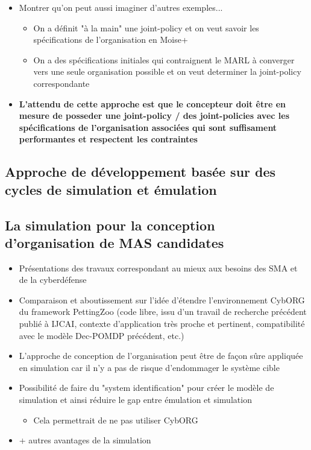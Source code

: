 \documentclass[runningheads]{llncs}
\begin{document}
\begin{itemize}
\begin{itemize}
\begin{itemize}
                    \end{itemize}
          \end{itemize}
    \item Montrer qu'on peut aussi imaginer d'autres exemples...
          \begin{itemize}
              \item On a définit "à la main" une joint-policy et on veut savoir les spécifications de l'organisation en Moise+
              \item On a des spécifications initiales qui contraignent le MARL à converger vers une seule organisation possible et on veut determiner la joint-policy correspondante
          \end{itemize}
    \item \textbf{L'attendu de cette approche est que le concepteur doit être en mesure de posseder une joint-policy / des joint-policies avec les spécifications de l'organisation associées qui sont suffisament performantes et respectent les contraintes}
\end{itemize}

\subsection{Approche de développement basée sur des cycles de simulation et émulation}

\subsection{La simulation pour la conception d'organisation de MAS candidates}
\begin{itemize}

    \item Présentations des travaux correspondant au mieux aux besoins des SMA et de la cyberdéfense
    \item Comparaison et aboutissement sur l’idée d’étendre l’environnement CybORG du framework PettingZoo (code libre, issu d’un travail de recherche précédent publié à IJCAI, contexte d’application très proche et pertinent, compatibilité avec le modèle Dec-POMDP précédent, etc.)
    \item L'approche de conception de l'organisation peut être de façon sûre appliquée en simulation car il n'y a pas de risque d'endommager le système cible
    \item Possibilité de faire du "system identification" pour créer le modèle de simulation et ainsi réduire le gap entre émulation et simulation
          \begin{itemize}
              \item Cela permettrait de ne pas utiliser CybORG
          \end{itemize}
    \item + autres avantages de la simulation
\end{itemize}
\end{document}

